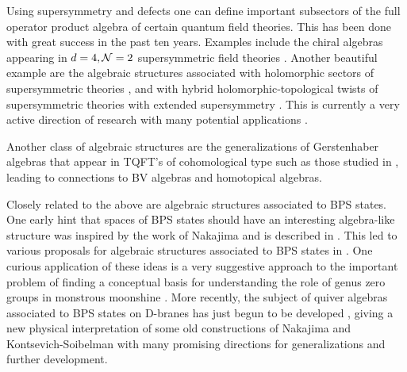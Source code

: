 \documentclass[12pt]{article}
\begin{document}
Using supersymmetry and defects one can define important subsectors
of the full operator product algebra of certain quantum field theories.
This has been done with great success in the past ten years.
Examples include the chiral algebras appearing in $d=4, {\cal{N}}=2$
supersymmetric field theories \cite{Beem:2013sza,Beem:2014rza,Beem:2017ooy}.
Another beautiful example are the algebraic structures associated with holomorphic sectors of supersymmetric theories \cite{Johansen1995,Clash1997}, 
and with  hybrid holomorphic-topological twists of supersymmetric theories
with extended supersymmetry \cite{NikThesis, NikBaulieuLosev, Kapustin:2006hi}.  
This is currently a very active direction of research with many potential applications 
\cite{Aganagic:2017tvx,Costello:2017dso,Costello:2020ndc,Gwilliam:2021zkv,Oh:2019mcg,Garner:2022its}.
 


Another class of algebraic structures are the generalizations of
Gerstenhaber algebras that appear in TQFT's of cohomological type
such as those studied in \cite{Beem:2018fng,Getzler:1994yd,Lian:1995wa}, leading to connections to BV algebras and homotopical algebras. 




Closely related to the above are algebraic structures associated to BPS
states.  One early hint that spaces of
BPS states should have an interesting algebra-like structure was inspired by the 
work of Nakajima \cite{Nak94,Nakajima-Heisenberg} and is described in \cite{Vafa:1994tf}. 
This led to various proposals for algebraic structures associated to BPS states in
\cite{Avatars,Harvey:1996gc,NikRome:2009,Kontsevich:2010px}. 
One curious application 
of these ideas is a   very suggestive approach to the
important problem of finding a conceptual basis for understanding
the role of genus zero groups in monstrous moonshine
\cite{Harrison:2021gnp,Paquette:2016xoo,Paquette:2017xui}.
More recently, the subject of quiver algebras associated to
BPS states on D-branes has just begun to be developed
\cite{Galakhov:2020vyb,Galakhov:2021xum,Galakhov:2021vbo,Noshita:2021ldl,Noshita:2021dgj},
giving a new physical interpretation of some old constructions of
Nakajima and Kontsevich-Soibelman with many promising directions
for generalizations and further development.
\end{document}
